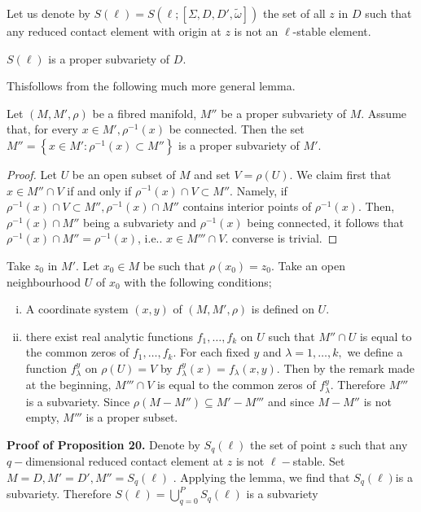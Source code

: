 Let us denote by $S(\ell)= S(\ell; [\Sigma, D, D', \tilde{\omega}])$
the set of all $z$ in $D$ such that any reduced contact element with
origin at $z$ is not an $\ell$-stable element. 

\begin{proposition}\label{chap3:sec3.11:prop20}%
  $S(\ell)$ is a proper subvariety of $D$. 
\end{proposition}

This\pageoriginale follows from the following much more general lemma.

\begin{lemma*}
  Let $(M, M', \rho )$ be a fibred manifold, $M''$ be a proper
  subvariety of $M$. Assume that, for every $x \in M', \rho^{-1} (x)$
  be connected. Then the set $M''= \left\{ x \in M' : \rho^{-1} (x)
  \subset M'' \right\}$ is a proper subvariety of $M'$. 
\end{lemma*}

\begin{proof}
  Let $U$ be an open subset of $M$ and set $V = \rho (U)$. We claim
  first that $x \in M'' \cap V$ if and only if $\rho^{-1}(x) \cap V
  \subset M''$. Namely, if $\rho^{-1}(x) \cap V \subset
  M'',\rho^{-1}(x) \cap M''$ contains interior points of
  $\rho^{-1}(x)$. Then, $\rho^{-1} (x) \cap M''$ being a subvariety
  and $\rho^{-1}(x)$ being connected, it follows that $\rho^{-1}(x)
  \cap M''= \rho^{-1}(x)$, i.e.. $x \in M''' \cap V$. converse is
  trivial. 
\end{proof}

Take $z_0$ in $M'$. Let $x_0 \in M$ be such that $\rho
(x_0)=z_0$. Take an open neighbourhood $U$ of $x_0$ with the following
conditions; 
\begin{enumerate}[(i)]
\item A coordinate system $(x,y)$ of $(M, M', \rho)$ is defined on $U$.
\item there exist real analytic functions $f_1, \ldots , f_k $ on $U$
  such that $M'' \cap U$ is equal to the common zeros of $f_1, \ldots
  , f_k$. For each fixed $y$ and $\lambda=1 , \ldots , k ,$ we define
  a function $f^y_\lambda$ on $\rho(U)=V$ by $f^y_\lambda(x)=
  f_\lambda (x,y)$. Then by the remark made at the beginning, $M'''
  \cap V$ is equal to the common zeros of $f^y_\lambda$. Therefore
  $M'''$ is a subvariety. Since $\rho (M-M'') \subseteq M'- M'''$ and
  since $M-M''$ is not empty, $M'''$ is a proper subset. 
\end{enumerate}

\noindent 
\textbf{Proof of Proposition 20.} 
Denote by $S_q (\ell)$ the set of point $z$ such that any
$q-$dimensional reduced contact element at $z$ is not
$\ell-$stable. Set $M = D, M' = D', M'' = S_q(\ell)$ . Applying the
lemma, we find that $S_q(\ell)$\pageoriginale is a subvariety. Therefore $S(\ell)=
\bigcup\limits^P_{q=0} S_q (\ell)$ is a subvariety  


